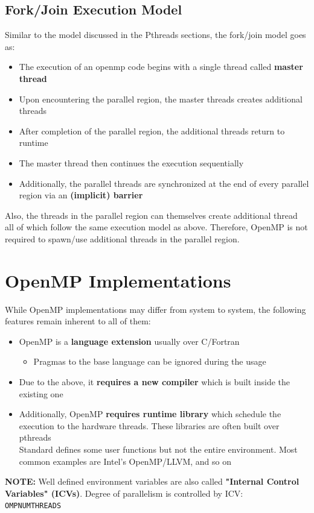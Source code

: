 \documentclass[12pt, a4paper]{report}
\begin{document}
\subsection{Fork/Join Execution Model}
Similar to the model discussed in the Pthreads sections, the fork/join model goes as:
\begin{itemize}
    \item The execution of an openmp code begins with a single thread called {\bfseries{master thread}}
    \item Upon encountering the parallel region, the master threads creates additional threads
    \item After completion of the parallel region, the additional threads return to runtime
    \item The master thread then continues the execution sequentially
    \item Additionally, the parallel threads are synchronized at the end of every parallel region via an {\bfseries{(implicit) barrier}}
\end{itemize}

Also, the threads in the parallel region can themselves create additional thread all of which follow the same execution model as above.
Therefore, OpenMP is not required to spawn/use additional threads in the parallel region. 

\section{OpenMP Implementations}
While OpenMP implementations may differ from system to system, the following features remain inherent to all of them:
\begin{itemize}
    \item OpenMP is a {\bfseries{language extension}} usually over C/Fortran 
            \begin{itemize}
                \item Pragmas to the base language can be ignored during the usage
            \end{itemize}
    \item Due to the above, it {\bfseries{requires a new compiler}} which is built inside the existing one
    \item Additionally, OpenMP {\bfseries{requires runtime library}} which schedule the execution to the hardware threads. These libraries
          are often built over pthreads\\
          Standard defines some user functions but not the entire environment. Most common examples are Intel's OpenMP/LLVM, and so on
\end{itemize}
{\bfseries{NOTE:}} Well defined environment variables are also called {\bfseries{"Internal Control Variables" (ICVs)}}. Degree of parallelism
is controlled by ICV: $\quad$ {\texttt{OMP\textunderscore NUM\textunderscore THREADS}}
\end{document}
